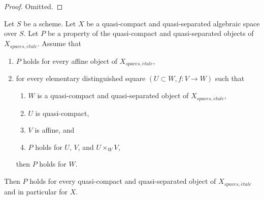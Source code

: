 \begin{proof}
Omitted.
\end{proof}

\begin{lemma}
\label{lemma-induction-principle}
Let $S$ be a scheme. Let $X$ be a quasi-compact and quasi-separated
algebraic space over $S$. Let $P$ be a property of the quasi-compact
and quasi-separated objects of $X_{spaces, \acute{e}tale}$. Assume that
\begin{enumerate}
\item $P$ holds for every affine object of $X_{spaces, \acute{e}tale}$,
\item for every elementary distinguished square $(U \subset W, f : V \to W)$
such that
\begin{enumerate}
\item $W$ is a quasi-compact and quasi-separated object of
$X_{spaces, \acute{e}tale}$,
\item $U$ is quasi-compact,
\item $V$ is affine, and
\item $P$ holds for $U$, $V$, and $U \times_W V$,
\end{enumerate}
then $P$ holds for $W$.
\end{enumerate}
Then $P$ holds for every quasi-compact and quasi-separated object
of $X_{spaces, \acute{e}tale}$ and in particular for $X$.
\end{lemma}

